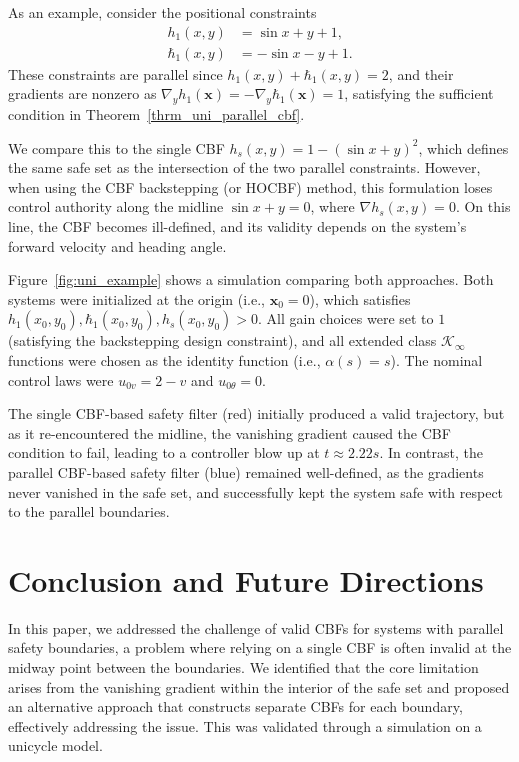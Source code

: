 \documentclass[letterpaper, 10 pt, conference]{ieeeconf}
\newcommand{\TODO}[1]{{\color{black}#1}}
\begin{document}
\TODO{As an example, consider the positional constraints 
\begin{align}
    h_1(x,y) &= \sin x + y + 1,\\
    \hbar_1(x,y) &= -\sin x - y + 1.
\end{align}
These constraints are parallel since $h_1(x,y) + \hbar_1(x,y) = 2$, and their gradients are nonzero as $\nabla_y h_1(\mathbf{x}) = -\nabla_y \hbar_1(\mathbf{x}) = 1$, satisfying the sufficient condition in Theorem~\ref{thrm_uni_parallel_cbf}.

We compare this to the single CBF 
$h_s(x,y) = 1 - (\sin x + y)^2$, 
which defines the same safe set as the intersection of the two parallel constraints. However, when using the CBF backstepping (or HOCBF) method, this formulation loses control authority along the midline $\sin x + y = 0$, where $\nabla h_s(x,y) = 0$. On this line, the CBF becomes ill-defined, and its validity depends on the system’s forward velocity and heading angle.

Figure~\ref{fig:uni_example} shows a simulation comparing both approaches. Both systems were initialized at the origin (i.e., $\mathbf{x}_0 = 0$), which satisfies $h_1(x_0,y_0), \hbar_1(x_0,y_0), h_s(x_0,y_0) > 0$. All gain choices were set to $1$ (satisfying the backstepping design constraint), and all extended class $\mathcal{K}_\infty$ functions were chosen as the identity function (i.e., $\alpha(s) = s$). The nominal control laws were $u_{0v} = 2 - v$ and $u_{0\theta} = 0$.

The single CBF-based safety filter (red) initially produced a valid trajectory, but as it re-encountered the midline, the vanishing gradient caused the CBF condition to fail, leading to a controller blow up at $t \approx 2.22s$. In contrast, the parallel CBF-based safety filter (blue) remained well-defined, as the gradients never vanished in the safe set, and successfully kept the system safe with respect to the parallel boundaries.
}

\section{Conclusion and Future Directions}  
 \TODO{In this paper, we addressed the challenge of valid CBFs for systems with parallel safety boundaries, a problem where relying on a single CBF  is often invalid at the midway point between the boundaries. We identified that the core limitation arises from the vanishing gradient within the interior of the safe set and proposed an alternative approach that constructs separate CBFs for each boundary, effectively addressing the issue. This was validated through a simulation on a unicycle model.}
    
\end{document}
